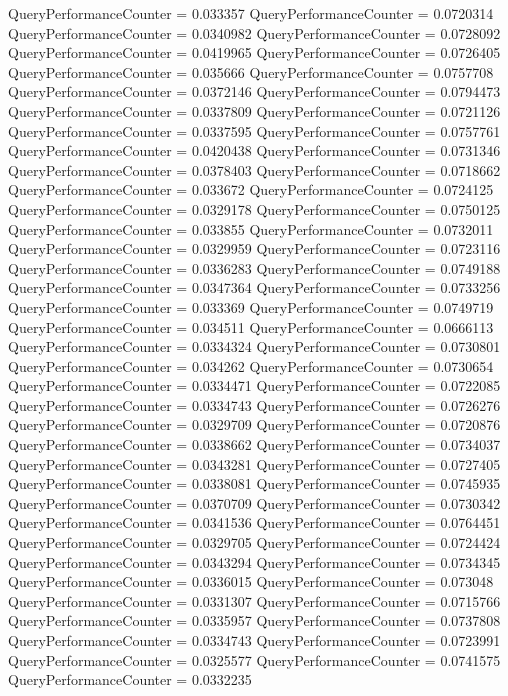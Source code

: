 \documentclass[9pt]{article}
\theoremstyle{plain}
\theoremstyle{definition}
\theoremstyle{remark}
\numberwithin{equation}{section}
\begin{document}
QueryPerformanceCounter  =  0.033357
QueryPerformanceCounter  =  0.0720314
QueryPerformanceCounter  =  0.0340982
QueryPerformanceCounter  =  0.0728092
QueryPerformanceCounter  =  0.0419965
QueryPerformanceCounter  =  0.0726405
QueryPerformanceCounter  =  0.035666
QueryPerformanceCounter  =  0.0757708
QueryPerformanceCounter  =  0.0372146
QueryPerformanceCounter  =  0.0794473
QueryPerformanceCounter  =  0.0337809
QueryPerformanceCounter  =  0.0721126
QueryPerformanceCounter  =  0.0337595
QueryPerformanceCounter  =  0.0757761
QueryPerformanceCounter  =  0.0420438
QueryPerformanceCounter  =  0.0731346
QueryPerformanceCounter  =  0.0378403
QueryPerformanceCounter  =  0.0718662
QueryPerformanceCounter  =  0.033672
QueryPerformanceCounter  =  0.0724125
QueryPerformanceCounter  =  0.0329178
QueryPerformanceCounter  =  0.0750125
QueryPerformanceCounter  =  0.033855
QueryPerformanceCounter  =  0.0732011
QueryPerformanceCounter  =  0.0329959
QueryPerformanceCounter  =  0.0723116
QueryPerformanceCounter  =  0.0336283
QueryPerformanceCounter  =  0.0749188
QueryPerformanceCounter  =  0.0347364
QueryPerformanceCounter  =  0.0733256
QueryPerformanceCounter  =  0.033369
QueryPerformanceCounter  =  0.0749719
QueryPerformanceCounter  =  0.034511
QueryPerformanceCounter  =  0.0666113
QueryPerformanceCounter  =  0.0334324
QueryPerformanceCounter  =  0.0730801
QueryPerformanceCounter  =  0.034262
QueryPerformanceCounter  =  0.0730654
QueryPerformanceCounter  =  0.0334471
QueryPerformanceCounter  =  0.0722085
QueryPerformanceCounter  =  0.0334743
QueryPerformanceCounter  =  0.0726276
QueryPerformanceCounter  =  0.0329709
QueryPerformanceCounter  =  0.0720876
QueryPerformanceCounter  =  0.0338662
QueryPerformanceCounter  =  0.0734037
QueryPerformanceCounter  =  0.0343281
QueryPerformanceCounter  =  0.0727405
QueryPerformanceCounter  =  0.0338081
QueryPerformanceCounter  =  0.0745935
QueryPerformanceCounter  =  0.0370709
QueryPerformanceCounter  =  0.0730342
QueryPerformanceCounter  =  0.0341536
QueryPerformanceCounter  =  0.0764451
QueryPerformanceCounter  =  0.0329705
QueryPerformanceCounter  =  0.0724424
QueryPerformanceCounter  =  0.0343294
QueryPerformanceCounter  =  0.0734345
QueryPerformanceCounter  =  0.0336015
QueryPerformanceCounter  =  0.073048
QueryPerformanceCounter  =  0.0331307
QueryPerformanceCounter  =  0.0715766
QueryPerformanceCounter  =  0.0335957
QueryPerformanceCounter  =  0.0737808
QueryPerformanceCounter  =  0.0334743
QueryPerformanceCounter  =  0.0723991
QueryPerformanceCounter  =  0.0325577
QueryPerformanceCounter  =  0.0741575
QueryPerformanceCounter  =  0.0332235
\end{document}
